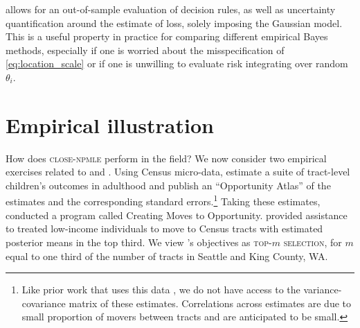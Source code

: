 \documentclass[12pt, reqno]{amsart}
\newcommand{\topm}{\textsc{top-{\small $m$} selection}}
\newcommand{\close}{\textsc{close}}
\newcommand{\npmle}{\textsc{npmle}}
\newcommand{\closenpmle}{\close-\npmle}
\numberwithin{equation}{section}
\begin{document}
 allows for an out-of-sample evaluation of decision rules, as well as
uncertainty quantification around the estimate of loss, solely imposing the Gaussian
model. %
This is a useful property in practice for comparing different empirical Bayes methods,
especially if one is worried about the misspecification of \eqref{eq:location_scale} or
if one is unwilling to evaluate risk integrating over random $\theta_i$. 





























\section{Empirical illustration}
\label{sec:empirical}


How does \closenpmle{} perform in the field? We now consider two empirical exercises
related to \citet{chetty2018opportunity} and \citet{bergman2019creating}. Using
 Census micro-data, \citet {chetty2018opportunity} estimate a suite of
tract-level children's outcomes in adulthood and publish an ``Opportunity Atlas'' of the
estimates and the corresponding
standard errors.\footnote{
\label{fn:correlation}Like prior work that uses this data
\citep [see, e.g., footnote 28 in] [] {andrews2021inference}, we do not have access to the
variance-covariance matrix of these estimates. Correlations across estimates are due to
small proportion of movers between tracts and are anticipated to be small. } Taking these
estimates, \citet{bergman2019creating} conducted a program
called {Creating Moves to Opportunity}. 
\citet{bergman2019creating} provided assistance to treated low-income individuals to move
 to Census tracts with estimated posterior means in the top third. We view \citet
 {bergman2019creating}'s objectives as \topm, for $m$ equal to one third of the number of
 tracts in Seattle and King County, WA.
\end{document}

